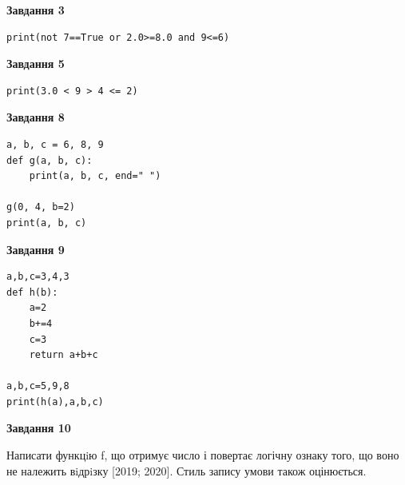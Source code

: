 \documentclass[12pt, ukrainian]{article}
\begin{document}
{\begin {large}
\begin{minipage}[t]{7.5cm}
\end{minipage}
\vline \hspace{6mm}
\begin{minipage}[t]{10.5cm}

\begin{center}
\textbf{Завдання 3}
\end{center}

\begin{verbatim}
print(not 7==True or 2.0>=8.0 and 9<=6)
\end{verbatim}



\begin{center}
\textbf{Завдання 5}
\end{center}

\begin{verbatim}
print(3.0 < 9 > 4 <= 2)
\end{verbatim}



\begin{center}
\textbf{Завдання 8}
\end{center}

\begin{verbatim}
a, b, c = 6, 8, 9
def g(a, b, c):
    print(a, b, c, end=" ")

g(0, 4, b=2)
print(a, b, c)
\end{verbatim}



\begin{center}
\textbf{Завдання 9}
\end{center}

\begin{verbatim}
a,b,c=3,4,3
def h(b):
    a=2
    b+=4
    c=3
    return a+b+c

a,b,c=5,9,8
print(h(a),a,b,c)
\end{verbatim}



\begin{center}
\textbf{Завдання 10}
\end{center}

Написати функцiю f, що отримує число і повертає логічну ознаку того, що воно не належить вiдрiзку [2019; 2020]. Стиль запису умови також оцінюється.\par

\end{minipage}

\end {large}}
\newpage
\end{document}
